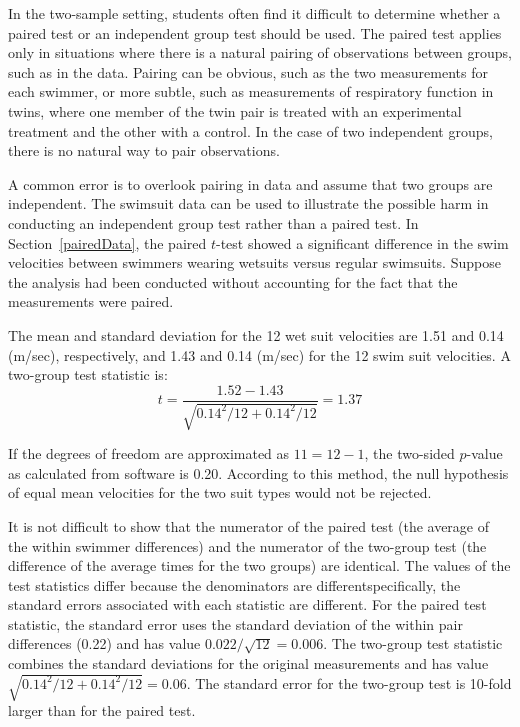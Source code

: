 In the two-sample setting, students often find it difficult to determine whether a paired test or an independent group test should be used.  The paired test applies only in situations where there is a natural pairing of observations between groups, such as in the  data. Pairing can be obvious, such as the two measurements for each swimmer, or more subtle, such as measurements of respiratory function in twins, where one member of the twin pair is treated with an experimental treatment and the other with a control. In the case of two independent groups, there is no natural way to pair observations.


A common error is to overlook pairing in data and assume that two groups are independent. The swimsuit data can be used to illustrate the possible harm in conducting an independent group test rather than a paired test. In Section~\ref{pairedData}, the paired $t$-test showed a significant difference in the swim velocities between swimmers wearing wetsuits versus regular swimsuits. Suppose the analysis had been conducted without accounting for the fact that the measurements were paired.


The mean and standard deviation for the 12 wet suit velocities are 1.51 and 0.14 (m/sec), respectively, and 1.43 and 0.14 (m/sec) for the 12 swim suit velocities. A two-group test statistic is:
\[t = \frac{1.52 - 1.43}{\sqrt{0.14^2/12 + 0.14^2/12}} = 1.37 \]

If the degrees of freedom are approximated as $11 = 12 - 1$, the two-sided $p$-value as calculated from software is 0.20. According to this method, the null hypothesis of equal mean velocities for the two suit types would not be rejected.

It is not difficult to show that the numerator of the paired test (the average of the within swimmer differences) and the numerator of the two-group test (the difference of the average times for the two groups) are identical. The values of the test statistics differ because the denominators are different\textemdash specifically, the standard errors associated with each statistic are different.  For the paired test statistic, the standard error uses the standard deviation of the within pair differences (0.22) and has value $0.022/\sqrt{12} = 0.006$. The two-group test statistic combines the standard deviations for the original measurements and has value $\sqrt{0.14^2/12 + 0.14^2/12} = 0.06$.  The standard error for the two-group test is 10-fold larger than for the paired test.  


